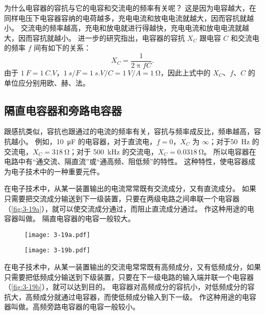 为什么电容器的容抗与它的电容和交流电的频率有关呢？
这是因为电容越大，在同样电压下电容器容纳的电荷越多，充电电流和放电电流就越大，因而容抗就越小。
交流电的频率越高，充电和放电就进行得越快，充电电流和放电电流就越大，因而容抗就越小。
进一步的研究指出，电容器的容抗 $X_C$ 跟电容 $C$ 和交流电的频率 $f$ 间有如下的关系：
\[X_C=\frac{1}{2\uppi fC}.\]
由于 $\qty{1}{F}=\qty{1}{C.V}$，$\qty{1}{s/F}=\qty{1}{s.V/C}=\qty{1}{V/A}=\qty{1}{\ohm}$，因此上式中的 $X_C$、$f$、$C$ 的单位应分别用欧、赫、法。

\subsection{隔直电容器和旁路电容器}
跟感抗类似，容抗也跟通过的电流的频率有关，容抗与频率成反比，频串越高，容抗越小。
例如，\qty{10}{\micro F} 的电容器，对于直流电，$f=0$，$X_C$ 为 $\infty$；对于\qty{50}{Hz} 的交流电，$X_C=\qty{318}{\ohm}$；对于 \qty{500}{kHz} 的交流电，$X_C=\qty{0.0318}{\ohm}$。
所以电容器在电路中有“通交流、隔直流”或“通高频、阻低频”的特性。
这种特性，使电容器成为电子技术中的一种重要元件。

在电子技术中，从某一装置输出的电流常常既有交流成分，又有直流成分。
如果只需要把交流成分输送到下一级装置，只要在两级电路之间串联一个电容器（\cref{fig:3-19a}），就可以使交流成分通过，而阻止直流成分通过。
作这种用途的电容器叫做。
隔直电容器的电容一般较大。
\begin{figure}
  \begin{minipage}[b]{0.48\linewidth}\centering
    \texttt{[image: 3-19a.pdf]}
    \label{fig:3-19a}
  \end{minipage}
  \begin{minipage}[b]{0.48\linewidth}\centering
    \texttt{[image: 3-19b.pdf]}
    \label{fig:3-19b}
  \end{minipage}
  \caption{}\label{fig:3-19}
\end{figure}

在电子技术中，从某一装置输出的交流电常常既有高频成分，又有低频成分，如果只需要把低频成分输送到下级装置，只要在下一级电路的输入端并联一个电容器（\cref{fig:3-19b}），就可以达到目的。
电容器对高频成分的容抗小，对低频成分的容抗大，高频成分就通过电容器，而使低频成分输入到下一级。
作这种用途的电容器叫做。高频旁路电容器的电容一般较小。

